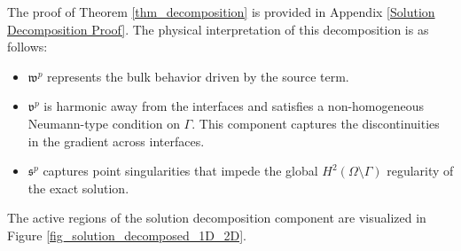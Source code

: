 \documentclass[oneside]{article}
\newcounter{reviewer}
\newcounter{point}[reviewer]
\begin{document}
\noindent The proof of Theorem \ref{thm_decomposition} is provided in Appendix \ref{Solution Decomposition Proof}.  
The physical interpretation of this decomposition is as follows:
\begin{itemize}
\item $\mathfrak{w}^p$ represents the bulk behavior driven by the source term.
\item $\mathfrak{v}^p$ is harmonic away from the interfaces and satisfies a non-homogeneous Neumann-type condition on $\Gamma$. This component captures the discontinuities in the gradient across interfaces.
\item $\mathfrak{s}^p$ captures point singularities that impede the global $H^2(\Omega\setminus\Gamma)$ regularity of the exact solution.
\end{itemize}

\noindent The active regions of the solution decomposition component are visualized in Figure \ref{fig_solution_decomposed_1D_2D}.
\end{document}
